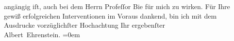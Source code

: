 \begin{ledgroupsized}[t]{13cm}
                    angängig iſt, auch bei dem Herrn Profeſſor Bie für mich zu wirken.\pend
           \pstart
           Für Ihre gewiß erfolgreichen Interventionen im Voraus dankend, bin ich mit dem
                    Ausdrucke vorzüglichſter Hochachtung \pend
           \pstart
           Ihr ergebenſter{\\[\baselineskip]}\spacefill\mbox{Albert Ehrenstein.}\pend
           \leftskip=0em{}          \endnumbering{}\end{ledgroupsized}  \newcommand{\dateiname}{L01887}\newcommand{\titel}{Albert Ehrenstein an Arthur Schnitzler, 22. 11. 1909}\newcommand{\editorInnen}{Martin Anton Müller und Gerd-Hermann Susen}
            \footnotesize
\begin{ledgroupsized}[t]{11.5cm}
\end{ledgroupsized}
         
      